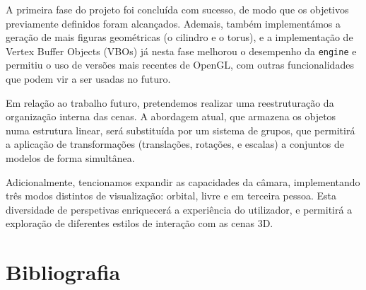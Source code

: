\documentclass[12pt, a4paper]{article}
\begin{document}
A primeira fase do projeto foi concluída com sucesso, de modo que os objetivos previamente definidos
foram alcançados. Ademais, também implementámos a geração de mais figuras geométricas (o cilindro e
o torus), e a implementação de Vertex Buffer Objects (VBOs) já nesta fase melhorou o desempenho da
\texttt{engine} e permitiu o uso de versões mais recentes de OpenGL, com outras funcionalidades que
podem vir a ser usadas no futuro.

Em relação ao trabalho futuro, pretendemos realizar uma reestruturação da organização interna das
cenas. A abordagem atual, que armazena os objetos numa estrutura linear, será substituída por um
sistema de grupos, que permitirá a aplicação de transformações (translações, rotações, e escalas) a
conjuntos de modelos de forma simultânea.

Adicionalmente, tencionamos expandir as capacidades da câmara, implementando três modos distintos de
visualização: orbital, livre e em terceira pessoa. Esta diversidade de perspetivas enriquecerá a
experiência do utilizador, e permitirá a exploração de diferentes estilos de interação com as cenas
3D.

\begingroup
\section{Bibliografia}
\renewcommand{\section}[2]{}
\end{document}
